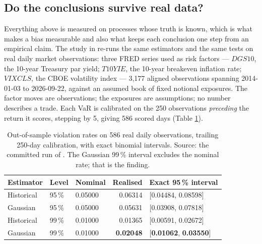 \documentclass[11pt,a4paper]{article}
\begin{document}
\subsection{Do the conclusions survive real data?}
\label{sec:realdata}
Everything above is measured on processes whose truth is known, which is what makes a bias
measurable and also what keeps each conclusion one step from an empirical claim. The study in
 re-runs the same estimators and the same tests on real
daily market observations: three FRED series used as risk factors --- $DGS10$, the 10-year
Treasury par yield; $T10YIE$, the 10-year breakeven inflation rate; $VIXCLS$, the CBOE volatility
index --- 3{,}177 aligned observations spanning 2014-01-03 to 2026-09-22, against an assumed book
of fixed notional exposures. The factor moves are observations; the exposures are assumptions; no
number describes a trade. Each VaR is calibrated on the 250 observations \emph{preceding} the
return it scores, stepping by 5, giving 586 scored days (Table \ref{tab:realdata}).

\begin{table}[t]
\caption[Out-of-sample VaR on real daily factor moves]{Out-of-sample violation rates on 586 real
daily observations, trailing 250-day calibration, with exact binomial intervals. Source: the
committed run of . The
Gaussian 99\,\% interval excludes the nominal rate; that is the finding.}
\label{tab:realdata}
\centering\small
\begin{tabular}{lllrl}
\toprule
Estimator & Level & Nominal & Realised & Exact 95\,\% interval \\
\midrule
Historical & 95\,\% & 0.05000 & 0.06314 & [0.04484, 0.08598] \\
Gaussian   & 95\,\% & 0.05000 & 0.05631 & [0.03908, 0.07818] \\
Historical & 99\,\% & 0.01000 & 0.01365 & [0.00591, 0.02672] \\
Gaussian   & 99\,\% & 0.01000 & \textbf{0.02048} & [\textbf{0.01062}, \textbf{0.03550}] \\
\bottomrule
\end{tabular}
\end{table}
\end{document}
